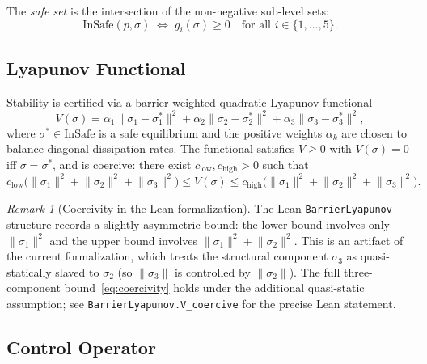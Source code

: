 \documentclass[11pt,a4paper]{article}
\theoremstyle{plain}
\theoremstyle{definition}
\theoremstyle{remark}
\newtheorem{remark}[theorem]{Remark}
\newcommand{\norm}[1]{\lVert #1 \rVert}
\newcommand{\InSafe}{\mathrm{InSafe}}
\newcommand{\leaninline}[1]{\texttt{#1}}
\begin{document}
The \emph{safe set} is the intersection of the non-negative sub-level
sets:
\begin{equation}\label{eq:safe-set}
  \InSafe(p, \sigma) \;\iff\; g_i(\sigma) \ge 0 \quad \text{for all } i \in \{1,\ldots,5\}.
\end{equation}

\subsection{Lyapunov Functional}

Stability is certified via a barrier-weighted quadratic Lyapunov functional
\begin{equation}\label{eq:lyapunov}
  V(\sigma) = \alpha_1 \norm{\sigma_1 - \sigma_1^*}^2
            + \alpha_2 \norm{\sigma_2 - \sigma_2^*}^2
            + \alpha_3 \norm{\sigma_3 - \sigma_3^*}^2,
\end{equation}
where $\sigma^* \in \InSafe$ is a safe equilibrium and the positive
weights $\alpha_k$ are chosen to balance diagonal dissipation rates.
The functional satisfies $V \ge 0$ with $V(\sigma) = 0$ iff
$\sigma = \sigma^*$, and is coercive: there exist $c_{\mathrm{low}},
c_{\mathrm{high}} > 0$ such that
\begin{equation}\label{eq:coercivity}
  c_{\mathrm{low}} \bigl(\norm{\sigma_1}^2 + \norm{\sigma_2}^2
    + \norm{\sigma_3}^2\bigr)
  \le V(\sigma) \le
  c_{\mathrm{high}} \bigl(\norm{\sigma_1}^2 + \norm{\sigma_2}^2
    + \norm{\sigma_3}^2\bigr).
\end{equation}

\begin{remark}[Coercivity in the Lean formalization]\label{rem:coercivity}
The Lean \leaninline{BarrierLyapunov} structure records a slightly
asymmetric bound: the lower bound involves only $\norm{\sigma_1}^2$
and the upper bound involves $\norm{\sigma_1}^2 + \norm{\sigma_2}^2$.
This is an artifact of the current formalization, which treats the
structural component $\sigma_3$ as quasi-statically slaved to $\sigma_2$
(so $\norm{\sigma_3}$ is controlled by $\norm{\sigma_2}$).
The full three-component bound~\eqref{eq:coercivity} holds under the
additional quasi-static assumption; see \leaninline{BarrierLyapunov.V\_coercive}
for the precise Lean statement.
\end{remark}

\subsection{Control Operator}
\end{document}
